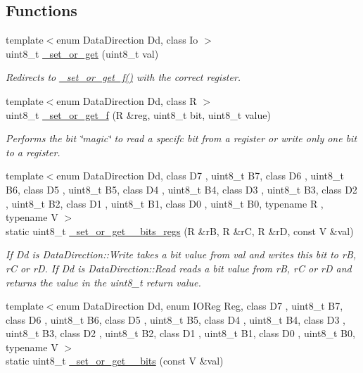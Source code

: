 \subsection*{Functions}
\begin{DoxyCompactItemize}
\item 
{\footnotesize template$<$enum Data\+Direction Dd, class Io $>$ }\\uint8\+\_\+t \hyperlink{namespaceports_aa339a9d178cb414c4cf243450d5887d2}{\+\_\+set\+\_\+or\+\_\+get} (uint8\+\_\+t val)
\begin{DoxyCompactList}\small\item\em Redirects to \hyperlink{namespaceports_a75686ee2e9a291c0095dec6d73e4af8d}{\+\_\+set\+\_\+or\+\_\+get\+\_\+f()} with the correct register. \end{DoxyCompactList}\item 
{\footnotesize template$<$enum Data\+Direction Dd, class R $>$ }\\uint8\+\_\+t \hyperlink{namespaceports_a75686ee2e9a291c0095dec6d73e4af8d}{\+\_\+set\+\_\+or\+\_\+get\+\_\+f} (R \&reg, uint8\+\_\+t bit, uint8\+\_\+t value)
\begin{DoxyCompactList}\small\item\em Performs the bit \char`\"{}magic\char`\"{} to read a specifc bit from a register or write only one bit to a register. \end{DoxyCompactList}\item 
{\footnotesize template$<$enum Data\+Direction Dd, class D7 , uint8\+\_\+t B7, class D6 , uint8\+\_\+t B6, class D5 , uint8\+\_\+t B5, class D4 , uint8\+\_\+t B4, class D3 , uint8\+\_\+t B3, class D2 , uint8\+\_\+t B2, class D1 , uint8\+\_\+t B1, class D0 , uint8\+\_\+t B0, typename R , typename V $>$ }\\static uint8\+\_\+t \hyperlink{namespaceports_a541ed8a2807f6d65c80cdf90cd7106eb}{\+\_\+set\+\_\+or\+\_\+get\+\_\+\_\+bits\+\_\+regs} (R \&rB, R \&rC, R \&rD, const V \&val)
\begin{DoxyCompactList}\small\item\em If Dd is Data\+Direction\+::\+Write takes a bit value from {\ttfamily val} and writes this bit to {\ttfamily rB}, {\ttfamily rC} or {\ttfamily rD}. If {\ttfamily Dd} is Data\+Direction\+::\+Read reads a bit value from {\ttfamily rB}, {\ttfamily rC} or {\ttfamily rD} and returns the value in the {\ttfamily uint8\+\_\+t} return value. \end{DoxyCompactList}\item 
{\footnotesize template$<$enum Data\+Direction Dd, enum I\+O\+Reg Reg, class D7 , uint8\+\_\+t B7, class D6 , uint8\+\_\+t B6, class D5 , uint8\+\_\+t B5, class D4 , uint8\+\_\+t B4, class D3 , uint8\+\_\+t B3, class D2 , uint8\+\_\+t B2, class D1 , uint8\+\_\+t B1, class D0 , uint8\+\_\+t B0, typename V $>$ }\\static uint8\+\_\+t \hyperlink{namespaceports_a9cb9b3646fb9795dfbe079336dfc6fbb}{\+\_\+set\+\_\+or\+\_\+get\+\_\+\_\+bits} (const V \&val)

\end{DoxyCompactItemize}

